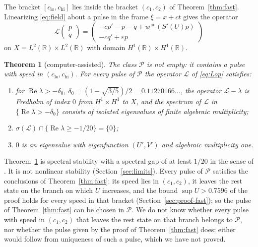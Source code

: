 \documentclass[11pt]{article}
\newtheorem{theorem}{Theorem}
\theoremstyle{definition}
\newcommand{\R}{\mathbb{R}}
\newcommand{\eps}{\varepsilon}
\newcommand{\re}{\operatorname{Re}}
\newcommand{\Lop}{\mathcal{L}}
\newcommand{\Pcl}{\mathcal{P}}
\newcommand{\dz}{\delta_0}
\begin{document}
The bracket $[c_{\mathrm{lo}}, c_{\mathrm{hi}}]$ lies inside the bracket $(c_1, c_2)$ of Theorem~\ref{thm:fast}. Linearizing \eqref{eq:field} about a pulse in the frame $\xi = x + ct$ gives the operator
\begin{equation}\label{eq:Lop}
  \Lop\begin{pmatrix} p \\ q \end{pmatrix} = \begin{pmatrix} -c p' - p - q + w * (S'(U) p) \\ -c q' + \eps p \end{pmatrix}
\end{equation}
on $X = L^2(\R) \times L^2(\R)$ with domain $H^1(\R) \times H^1(\R)$.

\begin{theorem}[computer-assisted]\label{thm:stab}
The class $\Pcl$ is not empty: it contains a pulse with speed in $(c_{\mathrm{lo}}, c_{\mathrm{hi}})$. For every pulse of $\Pcl$ the operator $\Lop$ of \eqref{eq:Lop} satisfies:
\begin{enumerate}
\item[(i)] for $\re\lambda > -\dz$, $\dz = (1 - \sqrt{3/5})/2 = 0.11270166\ldots$, the operator $\Lop - \lambda$ is Fredholm of index $0$ from $H^1 \times H^1$ to $X$, and the spectrum of $\Lop$ in $\{\re\lambda > -\dz\}$ consists of isolated eigenvalues of finite algebraic multiplicity;
\item[(ii)] $\sigma(\Lop) \cap \{\re\lambda \ge -1/20\} = \{0\}$;
\item[(iii)] $0$ is an eigenvalue with eigenfunction $(U', V')$ and algebraic multiplicity one.
\end{enumerate}
\end{theorem}

Theorem~\ref{thm:stab} is spectral stability with a spectral gap of at least $1/20$ in the sense of \cite{kp2013}. It is not nonlinear stability (Section~\ref{sec:limits}). Every pulse of $\Pcl$ satisfies the conclusions of Theorem~\ref{thm:fast}: its speed lies in $(c_1, c_2)$, it leaves the rest state on the branch on which $U$ increases, and the bound $\sup U > 0.7596$ of the proof holds for every speed in that bracket (Section~\ref{sec:proof-fast}); so the pulse of Theorem~\ref{thm:fast} can be chosen in $\Pcl$. We do not know whether every pulse with speed in $(c_1, c_2)$ that leaves the rest state on that branch belongs to $\Pcl$, nor whether the pulse given by the proof of Theorem~\ref{thm:fast} does; either would follow from uniqueness of such a pulse, which we have not proved.
\end{document}
